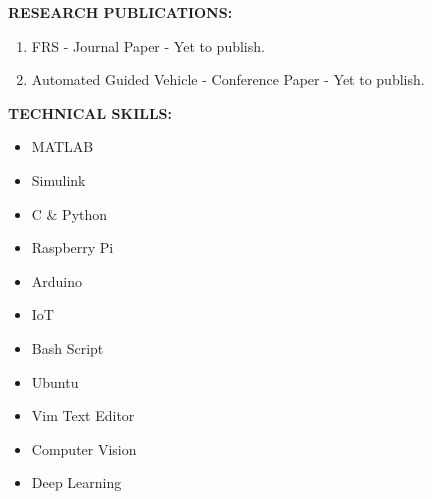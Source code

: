\documentclass[a4paper, 10pt]{article}
\begin{document}
{\textbf{\Large{RESEARCH PUBLICATIONS:}}}
\begin{enumerate}
\item FRS - Journal Paper - Yet to publish.
\item Automated Guided Vehicle - Conference Paper - Yet to publish. \\
\end{enumerate}

{\textbf{\Large{TECHNICAL SKILLS:}}}
\begin{itemize}
\item MATLAB
\item Simulink
\item C \& Python
\item Raspberry Pi
\item Arduino
\item IoT
\item Bash Script
\item Ubuntu
\item Vim Text Editor
\item Computer Vision
\item Deep Learning \\
\end{itemize}
\end{document}
